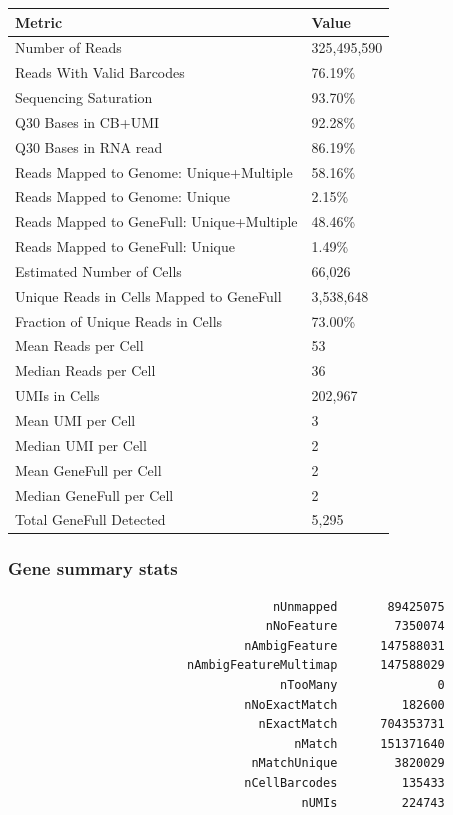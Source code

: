 \documentclass[
  11pt,
  a4paper,
]{report}
\begin{document}
\begin{longtable}[]{@{}ll@{}}
\toprule\noalign{}
Metric & Value \\
\midrule\noalign{}
\endhead
\bottomrule\noalign{}
\endlastfoot
Number of Reads & 325,495,590 \\
Reads With Valid Barcodes & 76.19\% \\
Sequencing Saturation & 93.70\% \\
Q30 Bases in CB+UMI & 92.28\% \\
Q30 Bases in RNA read & 86.19\% \\
Reads Mapped to Genome: Unique+Multiple & 58.16\% \\
Reads Mapped to Genome: Unique & 2.15\% \\
Reads Mapped to GeneFull: Unique+Multiple & 48.46\% \\
Reads Mapped to GeneFull: Unique & 1.49\% \\
Estimated Number of Cells & 66,026 \\
Unique Reads in Cells Mapped to GeneFull & 3,538,648 \\
Fraction of Unique Reads in Cells & 73.00\% \\
Mean Reads per Cell & 53 \\
Median Reads per Cell & 36 \\
UMIs in Cells & 202,967 \\
Mean UMI per Cell & 3 \\
Median UMI per Cell & 2 \\
Mean GeneFull per Cell & 2 \\
Median GeneFull per Cell & 2 \\
Total GeneFull Detected & 5,295 \\
\end{longtable}

\subsubsection{Gene summary stats}\label{gene-summary-stats}

\begin{verbatim}
                                     nUnmapped       89425075
                                    nNoFeature        7350074
                                 nAmbigFeature      147588031
                         nAmbigFeatureMultimap      147588029
                                      nTooMany              0
                                 nNoExactMatch         182600
                                   nExactMatch      704353731
                                        nMatch      151371640
                                  nMatchUnique        3820029
                                 nCellBarcodes         135433
                                         nUMIs         224743
\end{verbatim}
\end{document}
